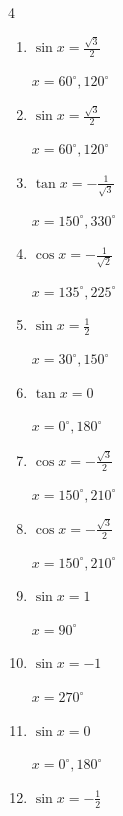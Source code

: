 \begin{multicols}{4}
\begin{enumerate}
        $\displaystyle x = 240^{\circ} , 300^{\circ}$

  \item $\displaystyle \sin{x}  = \frac{\sqrt{3}}{2}$

        $\displaystyle x = 60^{\circ} , 120^{\circ}$

\columnbreak %

  \item $\displaystyle \sin{x}  = \frac{\sqrt{3}}{2}$

        $\displaystyle x = 60^{\circ} , 120^{\circ}$

  \item $\displaystyle \tan{x}  = -\frac{1}{\sqrt{3}}$

        $\displaystyle x = 150^{\circ} , 330^{\circ}$

  \item $\displaystyle \cos{x}  = -\frac{1}{\sqrt{2}}$

        $\displaystyle x = 135^{\circ} , 225^{\circ}$

  \item $\displaystyle \sin{x}  = \frac{1}{2}$

        $\displaystyle x = 30^{\circ} , 150^{\circ}$

  \item $\displaystyle \tan{x}  = 0$

        $\displaystyle x = 0^{\circ} , 180^{\circ}$

  \item $\displaystyle \cos{x}  = -\frac{\sqrt{3}}{2}$

        $\displaystyle x = 150^{\circ} , 210^{\circ}$

  \item $\displaystyle \cos{x}  = -\frac{\sqrt{3}}{2}$

        $\displaystyle x = 150^{\circ} , 210^{\circ}$

  \item $\displaystyle \sin{x}  = 1$

        $\displaystyle x = 90^{\circ}$

  \item $\displaystyle \sin{x}  = -1$

        $\displaystyle x = 270^{\circ}$

  \item $\displaystyle \sin{x}  = 0$

        $\displaystyle x = 0^{\circ} , 180^{\circ}$

  \item $\displaystyle \sin{x}  = -\frac{1}{2}$


\end{enumerate}
\end{multicols}
